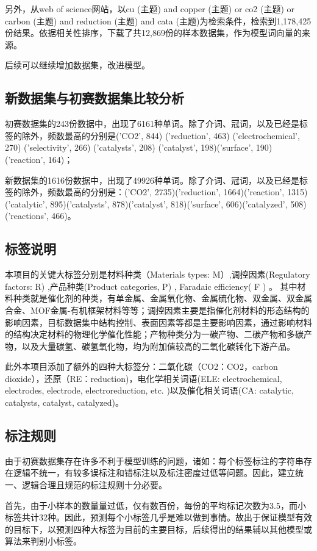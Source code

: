 \documentclass{article}
\begin{document}
另外，从web of science网站，以cu (主题) and copper (主题) or co2 (主题) or carbon (主题) and reduction (主题) and cata (主题)为检索条件，检索到1,178,425份结果。依据相关性排序，下载了共12,869份的样本数据集，作为模型词向量的来源。

后续可以继续增加数据集，改进模型。
\subsection{新数据集与初赛数据集比较分析}
初赛数据集的243份数据中，出现了6161种单词。除了介词、冠词，以及已经是标签的除外，频数最高的分别是('CO2', 844) ('reduction', 463) ('electrochemical', 270) ('selectivity', 266) ('catalysts', 208) ('catalyst', 198)('surface', 190)('reaction', 164)；


新数据集的1616份数据中，出现了49926种单词。除了介词、冠词，以及已经是标签的除外，频数最高的分别是：('CO2', 2735)('reduction', 1664)('reaction', 1315)('catalytic', 895)('catalysts', 878)('catalyst', 818)('surface', 606)('catalyzed', 508)('reactions', 466)。
\subsection{标签说明}

本项目的关键大标签分别是材料种类（Materials types: M）,调控因素(Regulatory factors: R) ,产品种类(Product categories, P) , Faradaic efficiency( F ) 。
其中材料种类就是催化剂的种类，有单金属、金属氧化物、金属硫化物、双金属、双金属合金、MOF金属-有机框架材料等等；调控因素主要是指催化剂材料的形态结构的影响因素，目标数据集中结构控制、表面因素等都是主要影响因素，通过影响材料的结构决定材料的物理化学催化性能；产物种类分为一碳产物、二碳产物和多碳产物\cite{jiang2018metal}，以及大量碳氢、碳氢氧化物，均为附加值较高的二氧化碳转化下游产品。


此外本项目添加了额外的四种大标签分：二氧化碳（CO2：CO2，carbon dioxide），还原（RE：reduction)，电化学相关词语(ELE: electrochemical, electrodes, electrode, electroreduction, etc. )以及催化相关词语(CA: catalytic, catalysts, catalyst, catalyzed)。

\subsection{标注规则}
由于初赛数据集存在许多不利于模型训练的问题，诸如：每个标签标注的字符串存在逻辑不统一，有较多误标注和错标注以及标注密度过低等问题。因此，建立统一、逻辑合理且规范的标注规则十分必要。

首先，由于小样本的数量量过低，仅有数百份，每份的平均标记次数为3.5，而小标签共计32种。因此，预测每个小标签几乎是难以做到事情。故出于保证模型有效的目标下，以预测四种大标签为目前的主要目标，后续得出的结果辅以其他模型或算法来判别小标签。
\end{document}
